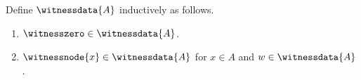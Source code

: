 \begin{datatype}\label{witness_data}
    Define $\witnessdata{A}$ inductively as follows.
    \begin{enumerate}
        \item $\witnesszero\in\witnessdata{A}$.
        \item $\witnessnode{x}\in\witnessdata{A}$ for
            $x\in A$ and $w\in\witnessdata{A}$.
    \end{enumerate}
\end{datatype}
